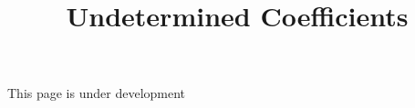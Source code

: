 \documentclass{ximera}
\title[Dig-In:]{Undetermined Coefficients}
\begin{document}
\begin{abstract}
  
\end{abstract}
\maketitle

This page is under development
\end{document}
